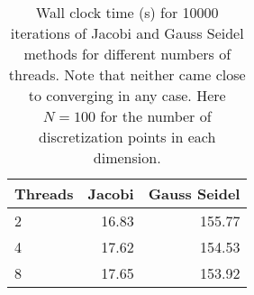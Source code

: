 \documentclass[12pt]{article}
\begin{document}
\begin{enumerate}
\begin{table}[H]
\centering
\begin{tabular}{| l | r | r |}
\hline
Threads & Jacobi & Gauss Seidel\\
\hline
2 &16.83 & 155.77\\
4 & 17.62 & 154.53\\
8 & 17.65 &  153.92\\
\hline
\end{tabular}
\caption{Wall clock time (s) for 10000 iterations of Jacobi and Gauss Seidel methods for different numbers of threads.  Note that neither came close to converging in any case.  Here $N = 100$ for the number of discretization points in each dimension.}
\label{table:jacobi_gs}
\end{table}






\end{enumerate}
\end{document}

